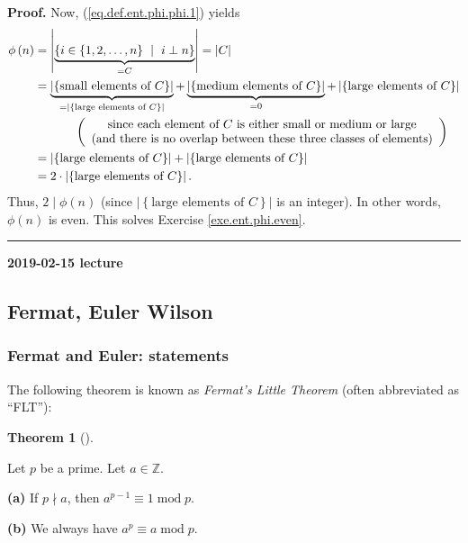 \documentclass[numbers=enddot,12pt,final,onecolumn,notitlepage]{scrartcl}%
\numberwithin{exer}{subsection}
\theoremstyle{definition}
\newtheorem{theo}{Theorem}[subsection]
\newenvironment{theorem}[1][]
{\begin{theo}[#1]\begin{leftbar}}
{\end{leftbar}\end{theo}}
\newenvironment{fineprint}{\begin{small}}{\end{small}}
\newenvironment{proof}[1][Proof]{\noindent\textbf{#1.} }{\ \rule{0.5em}{0.5em}}
\begin{document}
\begin{fineprint}
\begin{proof}
Now, (\ref{eq.def.ent.phi.phi.1}) yields%
\begin{align*}
\phi\left(  n\right)   &  =\left\vert \underbrace{\left\{  i\in\left\{
1,2,\ldots,n\right\}  \ \mid\ i\perp n\right\}  }_{=C}\right\vert =\left\vert
C\right\vert \\
&  =\underbrace{\left\vert \left\{  \text{small elements of }C\right\}
\right\vert }_{=\left\vert \left\{  \text{large elements of }C\right\}
\right\vert }+\underbrace{\left\vert \left\{  \text{medium elements of
}C\right\}  \right\vert }_{=0}+\left\vert \left\{  \text{large elements of
}C\right\}  \right\vert \\
&  \ \ \ \ \ \ \ \ \ \ \left(
\begin{array}
[c]{c}%
\text{since each element of }C\text{ is either small or medium or large}\\
\text{(and there is no overlap between these three classes of elements)}%
\end{array}
\right) \\
&  =\left\vert \left\{  \text{large elements of }C\right\}  \right\vert
+\left\vert \left\{  \text{large elements of }C\right\}  \right\vert \\
&  =2\cdot\left\vert \left\{  \text{large elements of }C\right\}  \right\vert
.
\end{align*}
Thus, $2\mid\phi\left(  n\right)  $ (since $\left\vert \left\{  \text{large
elements of }C\right\}  \right\vert $ is an integer). In other words,
$\phi\left(  n\right)  $ is even. This solves Exercise \ref{exe.ent.phi.even}.
\end{proof}
\end{fineprint}

\begin{center}
\textbf{2019-02-15 lecture}
\end{center}

\subsection{Fermat, Euler Wilson}

\subsubsection{Fermat and Euler: statements}

The following theorem is known as \textit{Fermat's Little Theorem} (often
abbreviated as \textquotedblleft FLT\textquotedblright):

\begin{theorem}
\label{thm.ent.fermat}Let $p$ be a prime. Let $a\in\mathbb{Z}$.

\textbf{(a)} If $p\nmid a$, then $a^{p-1}\equiv1\operatorname{mod}p$.

\textbf{(b)} We always have $a^{p}\equiv a\operatorname{mod}p$.
\end{theorem}
\end{document}
